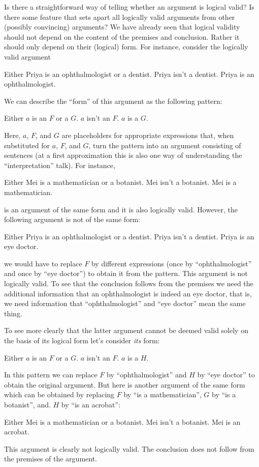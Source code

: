 Is there a straightforward way of telling whether an argument is logical valid? Is there some feature that sets apart all logically valid arguments from other (possibly convincing) arguments? We have already seen that logical validity should not depend on the content of the premises and conclusion. Rather it should only depend on their (logical) form. For instance, consider the logically valid argument 
\begin{earg}
	\prem Either Priya is an ophthalmologist or a dentist.
	\prem Priya isn't a dentist.
	\conc Priya is an ophthalmologist.
\end{earg}
We can describe the ``form'' of this argument as the following pattern:
\begin{earg}
	\prem Either $a$ is an $F$ or a $G$.
	\prem $a$ isn't an $F$.
	\conc $a$ is a $G$.
\end{earg}
Here, $a$, $F$, and $G$ are placeholders for appropriate expressions that, when substituted for $a$, $F$, and $G$, turn the pattern into an argument consisting of sentences (at a first approximation this is also one way of understanding the ``interpretation'' talk). For instance,
\begin{earg}
	\prem Either Mei is a mathematician or a botanist.
	\prem Mei isn't a botanist.
	\conc Mei is a mathematician.
\end{earg}
is an argument of the same form and it is also logically valid. However, the following argument is not of the same form: 
\begin{earg}
	\prem Either Priya is an ophthalmologist or a dentist.
	\prem Priya isn't a dentist.
	\conc Priya is an eye doctor.
\end{earg}
we would have to replace $F$ by different expressions (once by ``ophthalmologist'' and once by ``eye doctor'') to obtain it from the pattern. This argument is not logically valid. To see that the conclusion follows from the premises we need the additional information that an ophthalmologist is indeed an eye doctor, that is, we need information that ``ophthalmologist'' and ``eye doctor'' mean the same thing.

To see more clearly that the latter argument cannot be deemed valid solely on the basis of its logical form let's consider \emph{its} form:
\begin{earg}
	\prem Either $a$ is an $F$ or a $G$.
	\prem $a$ isn't an $F$.
	\conc $a$ is a $H$.
\end{earg}
In this pattern we can replace $F$ by ``ophthalmologist'' and $H$ by ``eye doctor'' to obtain the original argument.  But here is another argument of the same form which can be obtained by replacing $F$ by ``is a mathematician'', $G$ by ``is a botanist'', and. $H$ by ``is an acrobat'':
\begin{earg}
	\prem Either Mei is a mathematician or a botanist.
	\prem Mei isn't a botanist.
	\conc Mei is an acrobat.
\end{earg}
This argument is clearly not logically valid. The conclusion does not follow from the premises of the argument.

